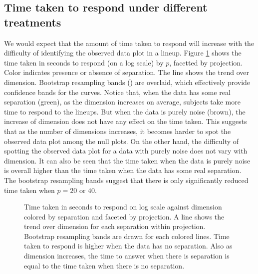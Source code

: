 
\subsection{Time taken to respond under different treatments}

We would expect that the amount of time taken to respond will increase with the difficulty of identifying the observed data plot in a lineup. Figure \ref{time-taken} shows the time taken in seconds to respond (on a log scale) by $p$, facetted by projection. Color indicates presence or absence of separation. The line shows the trend over dimension. Bootstrap resampling bands (\cite{buja:2005}) are overlaid, which effectively provide confidence bands for the curves. Notice that,  when the data has some real separation (green), as the dimension increases on average,  subjects take more time to respond to the lineups. But when the data is purely noise (brown), the increase of dimension does not have any effect on the time taken. This suggests that as the number of dimensions increases, it becomes harder to spot the observed data plot among the null plots. On the other hand, the difficulty of spotting the observed data plot for a data with purely noise does not vary with dimension. It can also be seen that the time taken when the data is purely noise is overall higher than the time taken when the data has some real separation. The bootstrap resampling bands suggest that there is only significantly reduced time taken when $p=20$ or $40$. 



\begin{figure}[hbtp]
   \centering
      \caption{Time taken in seconds to respond on log scale against dimension colored by separation and faceted by projection. A line shows the trend over dimension for each separation within projection. Bootstrap resampling bands are drawn for each colored lines. Time taken to respond is higher when the data has no separation. Also as dimension increases, the time to answer when there is separation is equal to the time taken when there is no separation. }
       \label{time-taken}
\end{figure}

